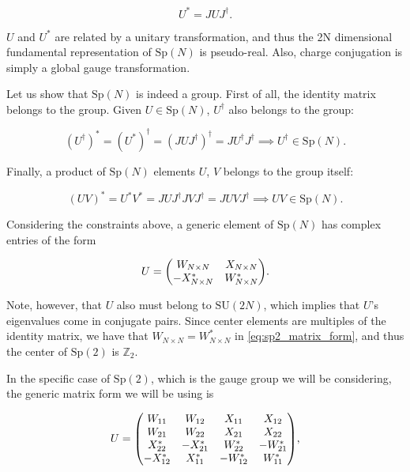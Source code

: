 \documentclass[reqno,12pt]{article}
\numberwithin{equation}{section}
\newcommand{\SU}{\mathrm{SU}}
\newcommand{\Sp}{\mathrm{Sp}}
\begin{document}
\begin{equation}
	U^* = J U J^\dagger.
\end{equation}

$U$ and $U^*$ are related by a unitary transformation, and thus the 2N dimensional fundamental representation of $\Sp(N)$ is pseudo-real.
Also, charge conjugation is simply a global gauge transformation.

Let us show that $\Sp(N)$ is indeed a group. First of all, the identity matrix belongs to the group. Given $U \in \Sp(N)$, $U^\dagger$ also
belongs to the group:

\begin{equation}
	(U^\dagger)^* = (U^*)^\dagger = (J U J^\dagger)^\dagger = J U^\dagger J^\dagger \implies U^\dagger \in \Sp(N).
\end{equation}

Finally, a product of $\Sp(N)$ elements $U$, $V$ belongs to the group itself:

\begin{equation}
	(U V)^* = U^* V^* = J U J^\dagger J V J^\dagger = J U V J^\dagger \implies UV \in \Sp(N).
\end{equation}

Considering the constraints above, a generic element of $\Sp(N)$ has complex entries of the form

\begin{equation} \label{eq:sp2_matrix_form}
	U = \mqty(W_{N \times N} & X_{N \times N} \\ -X_{N \times N}^* & W_{N \times N}^*).
\end{equation}

Note, however, that $U$ also must belong to $\SU(2N)$, which implies that $U$'s eigenvalues come in conjugate pairs. Since center elements
are multiples of the identity matrix, we have that $W_{N \times N} = W_{N \times N}^*$ in \eqref{eq:sp2_matrix_form}, 
and thus the center of $\Sp(2)$ is $\mathbb{Z}_2$.

In the specific case of $\Sp(2)$, which is the gauge group we will be considering, the generic matrix form we
will be using is

\begin{equation}
	U = \mqty(
		W_{11} & W_{12} & X_{11} & X_{12} \\
		W_{21} & W_{22} & X_{21} & X_{22} \\
		X^*_{22} & -X^*_{21} & W^*_{22} & -W^*_{21} \\
		-X^*_{12} & X^*_{11} & -W^*_{12} & W^*_{11}
	),
\end{equation}
\end{document}
